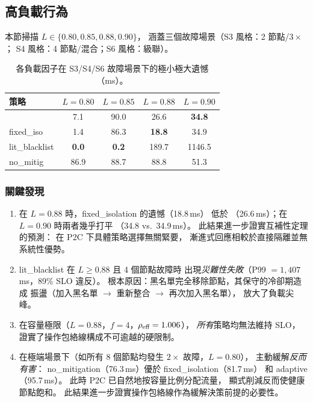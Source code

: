 \subsection{高負載行為}
\label{sec:eval-highload}

本節掃描 $L \in \{0.80, 0.85, 0.88, 0.90\}$，
涵蓋三個故障場景（S3 風格：2 節點/$3\times$；
S4 風格：4 節點/混合；S6 風格：級聯）。

\begin{table}[t]
\centering
\caption{各負載因子在 S3/S4/S6 故障場景下的極小極大遺憾（ms）。}
\label{tab:highload}
\footnotesize
\begin{tabular}{@{}lcccc@{}}
\toprule
策略 & $L{=}0.80$ & $L{=}0.85$ & $L{=}0.88$ & $L{=}0.90$ \\
\midrule
\system{} & 7.1 & 90.0 & 26.6 & \textbf{34.8} \\
fixed\_iso & 1.4 & 86.3 & \textbf{18.8} & 34.9 \\
lit\_blacklist & \textbf{0.0} & \textbf{0.2} & 189.7 & 1146.5 \\
no\_mitig & 86.9 & 88.7 & 88.8 & 51.3 \\
\bottomrule
\end{tabular}
\end{table}

\subsubsection*{關鍵發現}
\begin{enumerate}
\item 在 $L = 0.88$ 時，fixed\_isolation 的遺憾（18.8\,ms）
  低於 \system{}（26.6\,ms）；在 $L = 0.90$ 時兩者幾乎打平
  （34.8 vs.\ 34.9\,ms）。
  此結果進一步證實互補性定理的預測：
  在 P2C 下具體策略選擇無關緊要，
  漸進式回應相較於直接隔離並無系統性優勢。

\item lit\_blacklist 在 $L \geq 0.88$ 且 4 個節點故障時
  出現\emph{災難性失敗}（P99 $= 1{,}407$\,ms，89\% SLO 違反）。
  根本原因：黑名單完全移除節點，其保守的冷卻期造成
  振盪（加入黑名單 $\to$ 重新整合 $\to$ 再次加入黑名單），
  放大了負載尖峰。

\item 在容量極限（$L = 0.88$，$f = 4$，$\rho_{\text{eff}} = 1.006$），
  \emph{所有}策略均無法維持 SLO，
  證實了操作包絡線構成不可逾越的硬限制。

\item 在極端場景下（如所有 8 個節點均發生 $2\times$ 故障，$L = 0.80$），
  主動緩解\emph{反而有害}：
  no\_mitigation（76.3\,ms）優於 fixed\_isolation（81.7\,ms）
  和 adaptive（95.7\,ms）。
  此時 P2C 已自然地按容量比例分配流量，
  顯式削減反而使健康節點飽和。
  此結果進一步證實操作包絡線作為緩解決策前提的必要性。
\end{enumerate}

